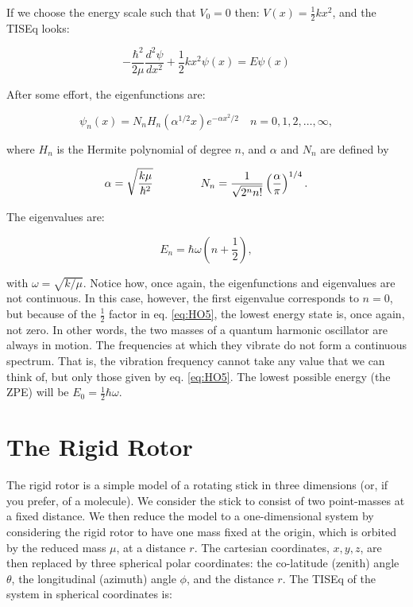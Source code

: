 \documentclass[
  9pt,
]{extbook}
\theoremstyle{definition}
\theoremstyle{definition}
\theoremstyle{definition}
\theoremstyle{remark}
\begin{document}
If we choose the energy scale such that \(V_0 = 0\) then: \(V(x) = \frac{1}{2}kx^2\), and the TISEq looks:

\begin{equation}
- \frac{\hbar^2}{2 \mu} \frac{d^2\psi}{dx^2} + \frac{1}{2} kx^2 \psi(x) =
E \psi(x)
\label{eq:HO2}
\end{equation}

After some effort, the eigenfunctions are:

\begin{equation}
\psi_n(x) = N_n H_n(\alpha^{1/2} x) e^{-\alpha x^2 / 2} \quad n=0,1,2,\ldots,\infty,
\label{eq:HO3}
\end{equation}

where \(H_n\) is the Hermite polynomial of degree \(n\), and \(\alpha\) and \(N_n\) are defined by

\begin{equation}
\alpha = \sqrt{\frac{k \mu}{\hbar^2}} \hspace{1.5cm}
N_n = \frac{1}{\sqrt{2^n n!}} \left( \frac{\alpha}{\pi} \right)^{1/4}.
\label{eq:HO4}
\end{equation}

The eigenvalues are:

\begin{equation}
E_n = \hbar \omega \left(n + \frac{1}{2} \right),
\label{eq:HO5}
\end{equation}

with \(\omega = \sqrt{k/ \mu}\). Notice how, once again, the eigenfunctions and eigenvalues are not continuous. In this case, however, the first eigenvalue corresponds to \(n=0\), but because of the \(\frac{1}{2}\) factor in eq. \eqref{eq:HO5}, the lowest energy state is, once again, not zero. In other words, the two masses of a quantum harmonic oscillator are always in motion. The frequencies at which they vibrate do not form a continuous spectrum. That is, the vibration frequency cannot take any value that we can think of, but only those given by eq. \eqref{eq:HO5}. The lowest possible energy (the ZPE) will be \(E_0 = \frac{1}{2} \hbar \omega\).

\hypertarget{the-rigid-rotor}{%
\section{The Rigid Rotor}\label{the-rigid-rotor}}

The rigid rotor is a simple model of a rotating stick in three dimensions (or, if you prefer, of a molecule). We consider the stick to consist of two point-masses at a fixed distance. We then reduce the model to a one-dimensional system by considering the rigid rotor to have one mass fixed at the origin, which is orbited by the reduced mass \(\mu\), at a distance \(r\). The cartesian coordinates, \(x,y,z\), are then replaced by three spherical polar coordinates: the co-latitude (zenith) angle \(\theta\), the longitudinal (azimuth) angle \(\phi\), and the distance \(r\). The TISEq of the system in spherical coordinates is:
\end{document}
